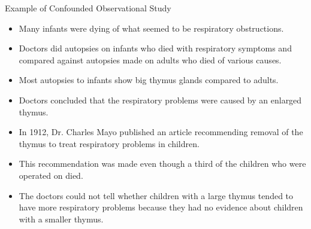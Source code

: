 \documentclass[handout]{beamer}
\begin{document}
\begin{frame}{Example of Confounded Observational Study}
\scriptsize{

\begin{itemize}

 \item Many infants were dying of what seemed to be respiratory obstructions.
 
 \item Doctors did autopsies on infants who died with respiratory symptoms and compared against autopsies made on adults who died of various causes.

\item Most autopsies to infants show big thymus glands compared to adults.

\item Doctors concluded that the respiratory problems were caused by an enlarged thymus. 


\item In 1912, Dr. Charles Mayo published an article recommending removal of the thymus to treat respiratory problems in children. 

\item This recommendation was made even though a third of the
children who were operated on died. 
  
\item The doctors could not tell whether children with a large thymus tended to have more respiratory problems because they had no evidence about children with a smaller thymus.  
  
\end{itemize}



} 
\end{frame}
\end{document}

